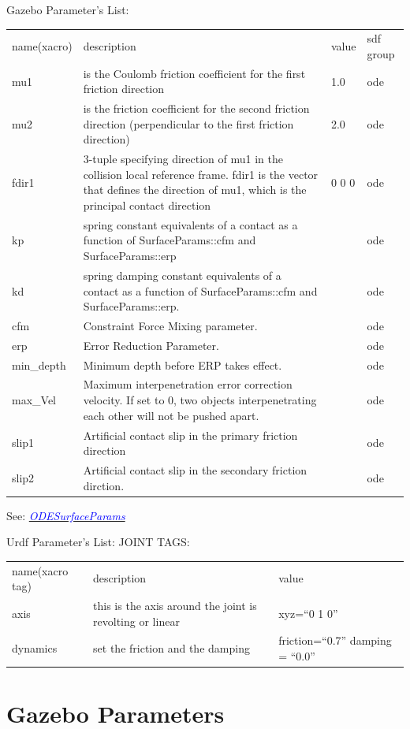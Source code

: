 \documentclass[twoside,colorback,accentcolor=tud4c,11pt]{tudreport}
\newcommand{\mylink}[2] {	\href{#1}{	\textit{\textcolor{blue}{#2}}}}
\begin{document}
Gazebo Parameter's List:\\
\begin{tabular}{l L{12cm} l l}
	name(xacro)&description&value&sdf group\\
	mu1&is the Coulomb friction coefficient for the first friction direction&1.0&ode\\
	mu2& is the friction coefficient for the second friction direction (perpendicular to the first friction direction)&2.0&ode\\
	fdir1& 3-tuple specifying direction of mu1 in the collision local reference frame. fdir1 is the vector that defines the direction of mu1, which is the principal contact direction &0 0 0&ode\\
	kp&spring constant equivalents of a contact as a function of SurfaceParams::cfm and SurfaceParams::erp & &ode \\
	kd&spring damping constant equivalents of a contact as a function of SurfaceParams::cfm and SurfaceParams::erp.   & &ode \\
	cfm&Constraint Force Mixing parameter.& &ode \\
	erp&Error Reduction Parameter.& &ode \\
	min\_depth&Minimum depth before ERP takes effect.   & &ode \\
	max\_Vel& Maximum interpenetration error correction velocity.
	If set to 0, two objects interpenetrating each other will not be pushed apart.  & &ode \\
	slip1&Artificial contact slip in the primary friction direction  & &ode \\
	slip2&Artificial contact slip in the secondary friction dirction.& &ode \\
	\end{tabular}

See: \mylink{http://osrf-distributions.s3.amazonaws.com/gazebo/api/dev/classgazebo_1_1physics_1_1ODESurfaceParams.html}{ODESurfaceParams}

	Urdf Parameter's List: JOINT TAGS:\\
	\begin{tabular}{l l l}
		name(xacro tag)&description&value\\
		axis&this is the axis around the joint is revolting or linear &xyz=``0 1 0''\\
		dynamics&set the friction and the damping &friction=``0.7'' damping = ``0.0''\\
	\end{tabular}

\section{Gazebo Parameters}
\end{document}

